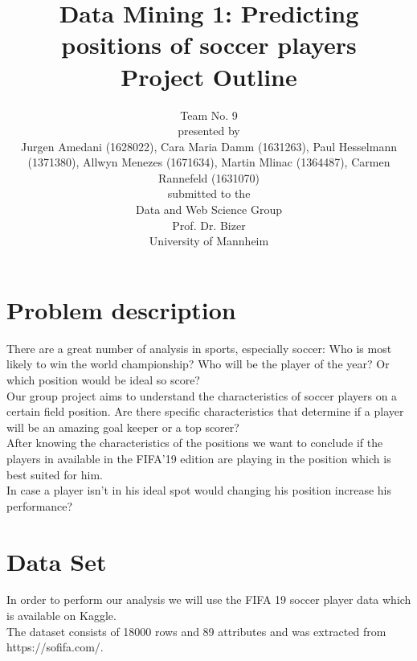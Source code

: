 \documentclass[runningheads]{llncs}
\begin{document}
%
\title{Data Mining 1: Predicting positions of soccer players\\
Project Outline}


\vspace{2cm}
\author{Team No. 9\\
\vspace{1cm}
presented by\\
Jurgen Amedani (1628022), Cara Maria Damm (1631263), Paul Hesselmann (1371380), Allwyn Menezes (1671634), Martin Mlinac (1364487), Carmen Rannefeld (1631070)\\
\vspace{1cm}
submitted to the \\
Data and Web Science Group\\
Prof. Dr. Bizer\\
University of Mannheim}

\maketitle              %
\newpage
\section{Problem description}
There are a great number of analysis in sports, especially soccer: Who is most likely to win the world championship? Who will be the player of the year? Or which position would be ideal so score? \\

Our group project aims to understand the characteristics of soccer players on a certain field position. Are there specific characteristics that determine if a player will be an amazing goal keeper or a top scorer?\\
After knowing the characteristics of the positions we want to conclude if the players in available in the FIFA'19 edition are playing in the position which is best suited for him.\\
In case a player isn't in his ideal spot would changing his position increase his performance?


\section{Data Set}
In order to perform our analysis we will use the FIFA 19 soccer player data which is available on Kaggle.\\
The dataset consists of 18000 rows and 89 attributes and was extracted from https://sofifa.com/.
\end{document}
